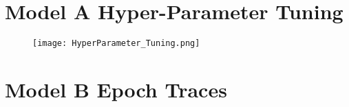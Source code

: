 \appendix
{}
\section{Model A Hyper-Parameter Tuning} \label{appendix:Model_A_Hyper-Parameter_Tuning}
\begin{figure}[h!]
    \centering
    \texttt{[image: HyperParameter\_Tuning.png]}
    \label{fig:modelA_hyperparam_tuning}
\end{figure}
\newpage

\section{Model B Epoch Traces}
